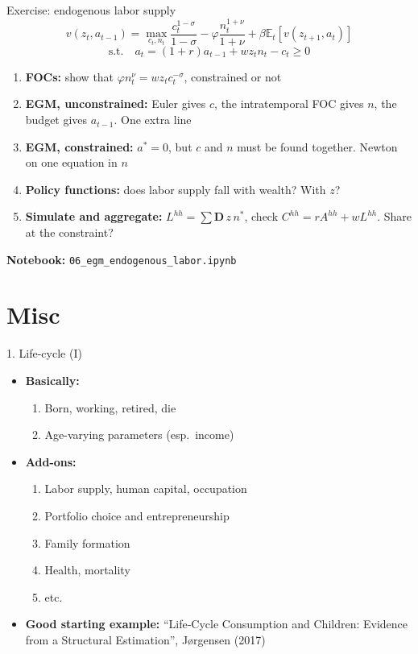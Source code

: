 \documentclass[
  10pt,
  ignorenonframetext,
  aspectratio=43,
  english,
  handout]{beamer}
\providecommand{\tightlist}{%
  \setlength{\itemsep}{0pt}\setlength{\parskip}{0pt}}
\begin{document}
\begin{frame}[fragile]{Exercise: endogenous labor supply}
\protect{}\label{exercise-endogenous-labor-supply}
\[
v(z_{t},a_{t-1})=\max_{c_{t},n_{t}}\frac{c_{t}^{1-\sigma}}{1-\sigma}-\varphi\frac{n_{t}^{1+\nu}}{1+\nu}+\beta\mathbb{E}_{t}\left[v(z_{t+1},a_{t})\right]
\]
\[
\text{s.t.}\quad a_{t}=(1+r)a_{t-1}+wz_{t}n_{t}-c_{t}\geq0
\]

\begin{enumerate}
\tightlist
\item
  \textbf{FOCs:} show that \(\varphi n_{t}^{\nu}=wz_{t}c_{t}^{-\sigma}\), constrained or not
\item
  \textbf{EGM, unconstrained:} Euler gives \(c\), the intratemporal FOC gives \(n\), the budget gives \(a_{t-1}\). One extra line
\item
  \textbf{EGM, constrained:} \(a^{\ast}=0\), but \(c\) and \(n\) must be found together. Newton on one equation in \(n\)
\item
  \textbf{Policy functions:} does labor supply fall with wealth? With \(z\)?
\item
  \textbf{Simulate and aggregate:} \(L^{hh}=\sum\boldsymbol{D}\,z\,n^{\ast}\), check \(C^{hh}=rA^{hh}+wL^{hh}\). Share at the constraint?
\end{enumerate}

\textbf{Notebook:} \texttt{06\_egm\_endogenous\_labor.ipynb}
\end{frame}

\section{Misc}\label{misc}

\begin{frame}{1. Life-cycle (I)}
\protect{}\label{life-cycle-i}
\begin{itemize}
\tightlist
\item
  \textbf{Basically:}

  \begin{enumerate}
  \tightlist
  \item
    Born, working, retired, die
  \item
    Age-varying parameters (esp.~income)
  \end{enumerate}
\item
  \textbf{Add-ons:}

  \begin{enumerate}
  \tightlist
  \item
    Labor supply, human capital, occupation
  \item
    Portfolio choice and entrepreneurship
  \item
    Family formation
  \item
    Health, mortality
  \item
    etc.
  \end{enumerate}
\item
  \textbf{Good starting example:} ``Life‐Cycle Consumption and Children:
  Evidence from a Structural Estimation'', Jørgensen (2017)
\end{itemize}
\end{frame}
\end{document}
